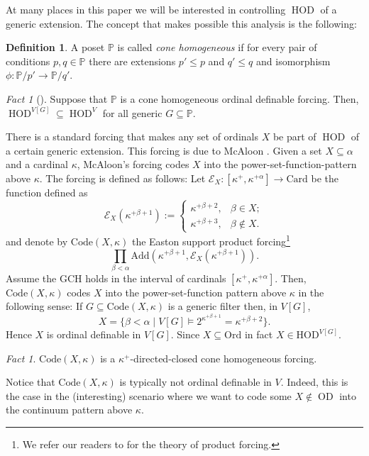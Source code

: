 \documentclass[11pt]{amsart}
\theoremstyle{definition}
\newtheorem{definition}[theorem]{Definition}
\theoremstyle{remark}
\newtheorem{fact}[theorem]{Fact}
\DeclareMathOperator{\HOD}{HOD}
\DeclareMathOperator{\OD}{OD}
\def\s{\subseteq}
\begin{document}
At many places in this paper we will be interested in controlling $\HOD$ of a generic extension. The concept that makes possible this analysis is the following:



    \begin{definition}
        A poset $\mathbb{P}$ is called \emph{cone homogeneous} if for every pair of conditions $p, q\in \mathbb{P}$ there are extensions $p'\leq p$ and $q'\leq q$ and isomorphism $\phi\colon \mathbb{P}/p'\to \mathbb{P}/q'$.
    \end{definition} 
    \begin{fact}[{\cite[Theorem 26.12]{Jech}}]
        Suppose that $\mathbb{P}$ is a cone homogeneous ordinal definable forcing. Then, $\HOD^{V[G]}\s \HOD^V$ for all generic   $G\s \mathbb{P}$. 
    \end{fact}

   
    

 There is a standard forcing that makes any set of ordinals $X$ be part of $\HOD$ of a certain generic extension. This forcing is due to McAloon \cite{McAloon}.  Given a set $X\s \alpha$ and a cardinal $\kappa$, McAloon's forcing  codes $X$ into the power-set-function-pattern  above $\kappa$. The forcing is defined as follows:  Let $\mathcal{E}_X\colon [\kappa^+,\kappa^{+\alpha}]\to \mathrm{Card}$ be the function defined as
$$\mathcal{E}_X(\kappa^{+\beta+1}):=\begin{cases}
    \kappa^{+\beta+2}, & \text{$\beta\in X$};\\
  \kappa^{+\beta+3}, & \text{$\beta\notin X$}.
\end{cases}$$
and denote by $\mathrm{Code}(X,\kappa)$ the Easton support product forcing\footnote{We refer our readers to \cite{Kunen} for the theory of product forcing.} 
$$\prod_{\beta<\alpha}\mathrm{Add}(\kappa^{+\beta+1},\mathcal{E}_X(\kappa^{+\beta+1})).$$
Assume the GCH holds in the interval of cardinals $[\kappa^+,\kappa^{+\alpha}]$. Then, $\mathrm{Code}(X,\kappa)$ codes $X$ into the power-set-function pattern above $\kappa$ in the following sense: If  $G\s\mathrm{Code}(X,\kappa)$ is a generic filter then, in $V[G]$,
$$X=\{\beta<\alpha\mid V[G]\models 2^{\kappa^{+\beta+1}}=\kappa^{+\beta+2}\}.$$
Hence $X$ is ordinal definable in $V[G]$. Since $X\s \mathrm{Ord}$ in fact $X\in \mathrm{HOD}^{V[G]}$.





\begin{fact}
    $\mathrm{Code}(X,\kappa)$ is a $\kappa^+$-directed-closed cone homogeneous forcing.
\end{fact}
Notice that $\mathrm{Code}(X,\kappa)$ is typically not ordinal definable in $V$. Indeed, this is the case in the (interesting) scenario where we want to code some  $X\notin \OD$ into the continuum pattern above $\kappa$. 
\end{document}
